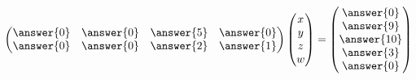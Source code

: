 \documentclass{ximera}
\begin{document}
\begin{exercise}
\begin{enumerate}
\begin{prompt}
\begin{equation*}
\begin{pmatrix}
          \answer{0} & \answer{0} &\answer{5} & \answer{0}\\
          \answer{0} & \answer{0} &\answer{2} & \answer{1}
        \end{pmatrix}
        \begin{pmatrix}
          x\\
          y\\
          z\\
          w
        \end{pmatrix}
        =
        \begin{pmatrix}
          \answer{0}\\
          \answer{9}\\
          \answer{10}\\
          \answer{3}\\
          \answer{0}
        \end{pmatrix}
      \end{equation*}\\
    \end{prompt}
  \end{enumerate}

\end{exercise}
\end{document}

